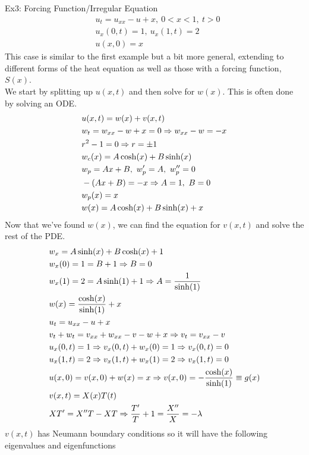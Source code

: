 \documentclass[11pt, fleqn]{article}
\begin{document}
Ex3: Forcing Function/Irregular Equation
\begin{align*}
    &u_t=u_{xx}-u+x,\ 0<x<1,\ t>0\\
    &u_x(0,t)=1,\ u_x(1,t)=2\\
    &u(x,0)=x
\end{align*}
This case is similar to the first example but a bit more general, extending to different forms of the heat equation as well as those with a forcing function, $S(x)$.\\
We start by splitting up $u(x,t)$ and then solve for $w(x)$. This is often done by solving an ODE.
\begin{align*}
    &u(x,t)=w(x)+v(x,t)\\
    &w_t=w_{xx}-w+x=0\Rightarrow w_{xx}-w=-x\\
    &r^2-1=0\Rightarrow r=\pm1\\
    &w_c(x)=A\cosh(x)+B\sinh(x)\\
    &w_p=Ax+B,\ w_p'=A,\ w_p''=0\\
    &-(Ax+B)=-x\Rightarrow A=1,\ B=0\\
    &w_p(x)=x\\
    &w(x)=A\cosh(x)+B\sinh(x)+x
\end{align*}
Now that we've found $w(x)$, we can find the equation for $v(x,t)$ and solve the rest of the PDE.
\begin{align*}
    &w_x=A\sinh(x)+B\cosh(x)+1\\
    &w_x(0)=1=B+1\Rightarrow B=0\\
    &w_x(1)=2=A\sinh(1)+1\Rightarrow A=\frac{1}{\sinh(1)}\\
    &w(x)=\frac{\cosh(x)}{\sinh(1)}+x\\
    &u_t=u_{xx}-u+x\\
    &v_t+w_t=v_{xx}+w_{xx}-v-w+x\Rightarrow v_t=v_{xx}-v\\
    &u_x(0,t)=1\Rightarrow v_x(0,t)+w_x(0)=1\Rightarrow v_x(0,t)=0\\
    &u_x(1,t)=2\Rightarrow v_x(1,t)+w_x(1)=2\Rightarrow v_x(1,t)=0\\
    &u(x,0)=v(x,0)+w(x)=x\Rightarrow v(x,0)=-\frac{\cosh(x)}{\sinh(1)}\equiv g(x)\\
    &v(x,t)=X(x)T(t)\\
    &XT'=X''T-XT\Rightarrow \frac{T'}{T}+1=\frac{X''}{X}=-\lambda
\end{align*}
$v(x,t)$ has Neumann boundary conditions so it will have the following eigenvalues and eigenfunctions
\end{document}
